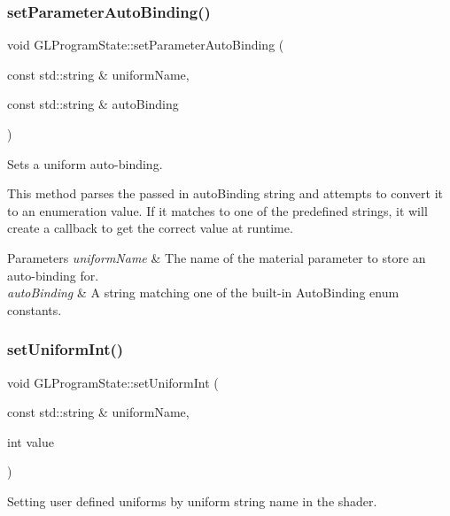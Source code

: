 \subsubsection{\texorpdfstring{set\+Parameter\+Auto\+Binding()}{setParameterAutoBinding()}\hspace{0.1cm}{\footnotesize\ttfamily [2/2]}}
{\footnotesize\ttfamily void G\+L\+Program\+State\+::set\+Parameter\+Auto\+Binding (\begin{DoxyParamCaption}\item[{const std\+::string \&}]{uniform\+Name,  }\item[{const std\+::string \&}]{auto\+Binding }\end{DoxyParamCaption})}

Sets a uniform auto-\/binding.

This method parses the passed in auto\+Binding string and attempts to convert it to an enumeration value. If it matches to one of the predefined strings, it will create a callback to get the correct value at runtime.


\begin{DoxyParams}{Parameters}
{\em uniform\+Name} & The name of the material parameter to store an auto-\/binding for. \\
\hline
{\em auto\+Binding} & A string matching one of the built-\/in Auto\+Binding enum constants. \\
\hline
\end{DoxyParams}
\mbox{\label{classGLProgramState_a7de1ddee54075d6279b8defcdcd33578}} 
\subsubsection{\texorpdfstring{set\+Uniform\+Int()}{setUniformInt()}\hspace{0.1cm}{\footnotesize\ttfamily [1/4]}}
{\footnotesize\ttfamily void G\+L\+Program\+State\+::set\+Uniform\+Int (\begin{DoxyParamCaption}\item[{const std\+::string \&}]{uniform\+Name,  }\item[{int}]{value }\end{DoxyParamCaption})}

Setting user defined uniforms by uniform string name in the shader. \mbox{\label{classGLProgramState_a7de1ddee54075d6279b8defcdcd33578}} 

